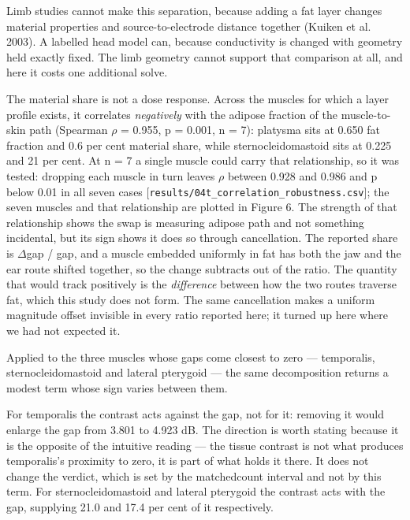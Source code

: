 \documentclass[
  11pt,
  letterpaper,
]{article}
\begin{document}
Limb studies cannot make this separation, because adding a fat layer changes
material properties and source-to-electrode distance together (Kuiken et al.
2003). A labelled head model can, because conductivity is changed with geometry
held exactly fixed. The limb geometry cannot support that comparison at all, and
here it costs one additional solve.

The material share is not a dose response. Across the muscles for which a layer
profile exists, it correlates \emph{negatively} with the adipose fraction of the
muscle-to-skin path (Spearman $\rho$ = \textminus{}0.955, p = 0.001, n = 7): platysma sits at
0.650 fat fraction and 0.6 per cent material share, while sternocleidomastoid
sits at 0.225 and 21 per cent. At n = 7 a single muscle could carry that
relationship, so it was tested: dropping each muscle in turn leaves $\rho$ between
\textminus{}0.928 and \textminus{}0.986 and p below 0.01 in all seven cases
{[}\texttt{results/04t\_correlation\_robustness.csv}{]}; the seven muscles and that
relationship are plotted in Figure 6. The strength of that relationship shows
the swap is measuring adipose path and not something incidental, but its sign
shows it does so through cancellation. The reported share is \textbar $\Delta$gap\textbar{} / \textbar gap\textbar, and
a muscle embedded uniformly in fat has both the jaw and the ear route shifted
together, so the change subtracts out of the ratio. The quantity that would
track positively is the \emph{difference} between how the two routes traverse fat,
which this study does not form. The same cancellation makes a uniform magnitude
offset invisible in every ratio reported here; it turned up here where we had
not expected it.

Applied to the three muscles whose gaps come closest to zero --- temporalis,
sternocleidomastoid and lateral pterygoid --- the same decomposition returns a
modest term whose sign varies between them.

For temporalis the contrast acts against the gap, not for it: removing it
would enlarge the gap from \textminus{}3.801 to \textminus{}4.923 dB. The direction is worth stating
because it is the opposite of the intuitive reading --- the tissue contrast is not
what produces temporalis's proximity to zero, it is part of what holds it there.
It does not change the verdict, which is set by the matched\textminus{}count interval and
not by this term. For sternocleidomastoid and lateral pterygoid the contrast acts
with the gap, supplying 21.0 and 17.4 per cent of it respectively.
\end{document}
